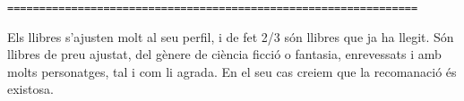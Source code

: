 \begin{verbatim}
================================================================
\end{verbatim}

Els llibres s'ajusten molt al seu perfil, i de fet 2/3 són llibres que ja ha llegit. Són llibres de preu ajustat, del gènere de ciència ficció o fantasia, enrevessats i amb molts personatges, tal i com li agrada. En el seu cas creiem que la recomanació és existosa.

